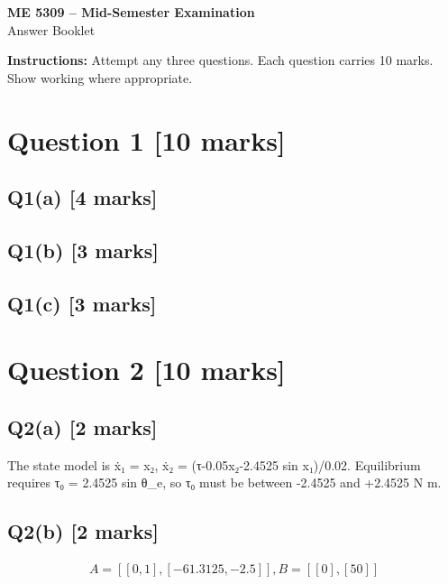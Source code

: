 \documentclass[11pt,a4paper]{article}
\begin{document}
\begin{center}
{\Large\bfseries ME 5309 -- Mid-Semester Examination}\\[3pt]
{\large Answer Booklet}\\[8pt]
\end{center}
\textbf{Instructions:} Attempt any three questions. Each question carries 10 marks. Show working where appropriate.
\section*{Question 1 \hfill [10 marks]}
\subsection*{Q1(a) \hfill [4 marks]}

\vspace{2mm}

\subsection*{Q1(b) \hfill [3 marks]}

\vspace{2mm}

\subsection*{Q1(c) \hfill [3 marks]}

\vspace{2mm}

\section*{Question 2 \hfill [10 marks]}
\subsection*{Q2(a) \hfill [2 marks]}

The state model is ẋ₁ = x₂, ẋ₂ = (τ-0.05x₂-2.4525 sin x₁)/0.02.
Equilibrium requires τ₀ = 2.4525 sin θ\_e, so τ₀ must be between -2.4525 and +2.4525 N m.

\subsection*{Q2(b) \hfill [2 marks]}

\[\begin{aligned}A = [[0,1], [-61.3125,-2.5]], B = [[0],[50]]\end{aligned}\]
\end{document}
